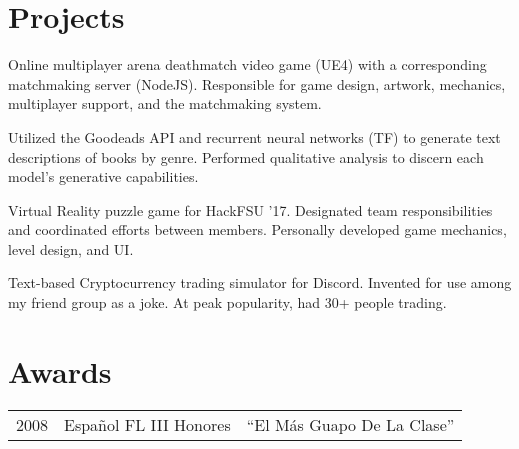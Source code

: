 \documentclass[]{deedy_resume}
\begin{document}
\begin{minipage}[t]{0.63\textwidth}

\section{Projects}
Online multiplayer arena deathmatch video game (UE4) with a corresponding matchmaking server (NodeJS). Responsible for game design, artwork, mechanics, multiplayer support, and the matchmaking system.
\sectionsep

Utilized the Goodeads API and recurrent neural networks (TF) to generate text descriptions of books by genre. Performed qualitative analysis to discern each model's generative capabilities.
\sectionsep

Virtual Reality puzzle game for HackFSU '17. Designated team responsibilities and coordinated efforts between members. Personally developed game mechanics, level design, and  UI.
\sectionsep

Text-based Cryptocurrency trading simulator for Discord. Invented for use among my friend group as a joke. At peak popularity, had 30+ people trading.
\sectionsep


\section{Awards} 
\begin{tabular}{rll}
2008	 & Espa\~nol FL III Honores  & ``El M\'as Guapo De La Clase'' \\
\end{tabular}
\sectionsep


\begin{comment}
\section{Publications} 
\renewcommand\refname{\vskip -1.5cm} %


\nocite{*}
\end{comment}

\end{minipage} 
\end{document}
